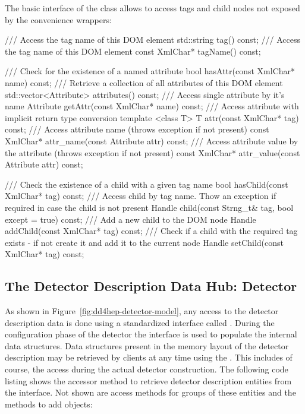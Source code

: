 \documentclass[10pt,a4paper]{article}
\begin{document}
\noindent
The basic interface of the  class allows to access tags
and child nodes not exposed by the convenience wrappers:
\begin{code}
  /// Access the tag name of this DOM element
  std::string tag() const;
  /// Access the tag name of this DOM element
  const XmlChar* tagName() const;

  /// Check for the existence of a named attribute
  bool hasAttr(const XmlChar* name) const;
  /// Retrieve a collection of all attributes of this DOM element
  std::vector<Attribute> attributes() const;
  /// Access single attribute by it's name
  Attribute getAttr(const XmlChar* name) const;
  /// Access attribute with implicit return type conversion
  template <class T> T attr(const XmlChar* tag) const;
  /// Access attribute name (throws exception if not present)
  const XmlChar* attr_name(const Attribute attr) const;
  /// Access attribute value by the attribute  (throws exception if not present)
  const XmlChar* attr_value(const Attribute attr) const;

  /// Check the existence of a child with a given tag name
  bool hasChild(const XmlChar* tag) const;
  /// Access child by tag name. Thow an exception if required in case the child is not present
  Handle child(const Strng_t& tag, bool except = true) const;
  /// Add a new child to the DOM node
  Handle addChild(const XmlChar* tag) const;
  /// Check if a child with the required tag exists - if not create it and add it to the current node
  Handle setChild(const XmlChar* tag) const;
\end{code}

\subsection{The Detector Description Data Hub: Detector}
\label{sec:dd4hep-user-manual-Detector-hub}
\noindent
As shown in Figure~\ref{fig:dd4hep-detector-model}, any access to the detector 
description data is done using a standardized interface called .
During the configuration phase of the detector the interface is used to populate
the internal data structures.
Data structures present in the memory layout of the detector description
may be retrieved by clients at any time using the 
.
This includes of course, the access during the actual detector construction.
The following code listing shows the accessor method to retrieve 
detector description entities from the interface. Not shown are access methods
for groups of these entities and the methods to add objects:
\end{document}

